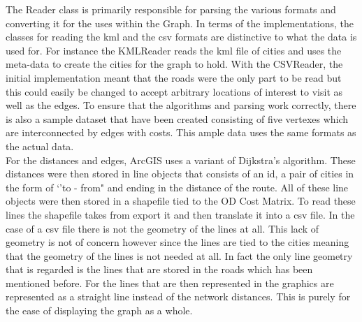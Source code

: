 \documentclass[midd]{thesis}
\newcommand{\tab}{\hspace*{2em}}
\begin{document}
\tab The Reader class is primarily responsible for parsing the various formats and converting it for the uses within the Graph. In terms of the implementations, the classes for reading the kml and the csv formats are distinctive to what the data is used for. For instance the KMLReader reads the kml file of cities and uses the meta-data to create the cities for the graph to hold. With the CSVReader, the initial implementation meant that the roads were the only part to be read but this could easily be changed to accept arbitrary locations of interest to visit as well as the edges. To ensure that the algorithms and parsing work correctly, there is also a sample dataset that have been created consisting of five vertexes which are interconnected by edges with costs. This ample data uses the same formats as the actual data.\\
\tab For the distances and edges, ArcGIS uses a variant of Dijkstra's algorithm\cite{gis}. These distances were then stored in line objects that consists of an id, a pair of cities in the form of `'to - from" and ending in the distance of the route. All of these line objects were then stored in a shapefile tied to the OD Cost Matrix. To read these lines the shapefile takes from export it and then translate it into a csv file. In the case of a csv file there is not the geometry of the lines at all. This lack of geometry is not of concern however since the lines are tied to the cities meaning that the geometry of the lines is not needed at all. In fact the only line geometry that is regarded is the lines that are stored in the roads which has been mentioned before. For the lines that are then represented in the graphics are represented as a straight line instead of the network distances. This is purely for the ease of displaying the graph as a whole.\\ 
\end{document}
